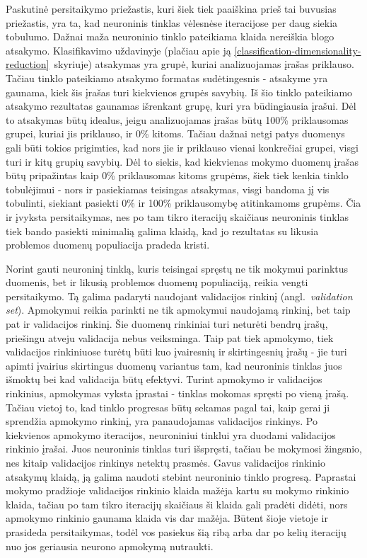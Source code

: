 \documentclass{VUMIFPSbakalaurinis}
\begin{document}
Paskutinė persitaikymo priežastis, kuri šiek tiek paaiškina prieš tai buvusias priežastis, yra ta, kad neuroninis tinklas vėlesnėse iteracijose per daug siekia tobulumo.
Dažnai maža neuroninio tinklo pateikiama klaida nereiškia blogo atsakymo.
Klasifikavimo uždavinyje (plačiau apie ją \ref{classification-dimensionality-reduction}~skyriuje) atsakymas yra grupė, kuriai analizuojamas įrašas priklauso.
Tačiau tinklo pateikiamo atsakymo formatas sudėtingesnis - atsakyme yra gaunama, kiek šis įrašas turi kiekvienos grupės savybių.
Iš šio tinklo pateikiamo atsakymo rezultatas gaunamas išrenkant grupę, kuri yra būdingiausia įrašui.
Dėl to atsakymas būtų idealus, jeigu analizuojamas įrašas būtų 100\% priklausomas grupei, kuriai jis priklauso, ir 0\% kitoms.
Tačiau dažnai netgi patys duomenys gali būti tokios prigimties, kad nors jie ir priklauso vienai konkrečiai grupei, visgi turi ir kitų grupių savybių.
Dėl to siekis, kad kiekvienas mokymo duomenų įrašas būtų pripažintas kaip 0\% priklausomas kitoms grupėms, šiek tiek kenkia tinklo tobulėjimui - nors ir pasiekiamas teisingas atsakymas, visgi bandoma jį vis tobulinti, siekiant pasiekti 0\% ir 100\% priklausomybę atitinkamoms grupėms.
Čia ir įvyksta persitaikymas, nes po tam tikro iteracijų skaičiaus neuroninis tinklas tiek bando pasiekti minimalią galima klaidą, kad jo rezultatas su likusia problemos duomenų populiacija pradeda kristi.

Norint gauti neuroninį tinklą, kuris teisingai spręstų ne tik mokymui parinktus duomenis, bet ir likusią problemos duomenų populiaciją, reikia vengti persitaikymo.
Tą galima padaryti naudojant validacijos rinkinį (angl.~\textit{validation set}).
Apmokymui reikia parinkti ne tik apmokymui naudojamą rinkinį, bet taip pat ir validacijos rinkinį.
Šie duomenų rinkiniai turi neturėti bendrų įrašų, priešingu atveju validacija nebus veiksminga.
Taip pat tiek apmokymo, tiek validacijos rinkiniuose turėtų būti kuo įvairesnių ir skirtingesnių įrašų - jie turi apimti įvairius skirtingus duomenų variantus tam, kad neuroninis tinklas juos išmoktų bei kad validacija būtų efektyvi.
Turint apmokymo ir validacijos rinkinius, apmokymas vyksta įprastai - tinklas mokomas spręsti po vieną įrašą.
Tačiau vietoj to, kad tinklo progresas būtų sekamas pagal tai, kaip gerai ji sprendžia apmokymo rinkinį, yra panaudojamas validacijos rinkinys.
Po kiekvienos apmokymo iteracijos, neuroniniui tinklui yra duodami validacijos rinkinio įrašai.
Juos neuroninis tinklas turi išspręsti, tačiau be mokymosi žingsnio, nes kitaip validacijos rinkinys netektų prasmės.
Gavus validacijos rinkinio atsakymų klaidą, ją galima naudoti stebint neuroninio tinklo progresą.
Paprastai mokymo pradžioje validacijos rinkinio klaida mažėja kartu su mokymo rinkinio klaida, tačiau po tam tikro iteracijų skaičiaus ši klaida gali pradėti didėti, nors apmokymo rinkinio gaunama klaida vis dar mažėja.
Būtent šioje vietoje ir prasideda persitaikymas, todėl vos pasiekus šią ribą arba dar po kelių iteracijų nuo jos geriausia neurono apmokymą nutraukti.
\end{document}
